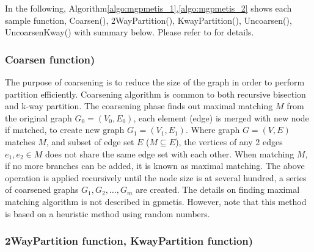 In the following,  Algorithm\ref{algo:mgpmetis_1},\ref{algo:mgpmetis_2} shows each sample function, 
Coarsen(), 2WayPartition(), KwayPartition(), Uncoarsen(), UncoarsenKway() with summary below. 
Please refer to \cite{Karypis1999} for details. 

\subsubsection{Coarsen function)}
The purpose of coarsening is to reduce the size of the graph in order to perform partition efficiently. 
Coarsening algorithm is common to both recursive bisection and k-way partition. 
The coarsening phase finds out maximal matching $M$ from the original graph $G_0=(V_0,E_0)$, 
each element (edge) is merged with new node if matched, to create new graph $G_1=(V_1,E_1)$. 
Where graph $G=(V,E)$ matches $M$, and subset of edge set $E$ ($M \subseteq E$), the vertices of any 2 edges $e_1,e_2 \in M$ does not share the same edge set with each other. 
When matching $M$, if no more branches can be added, it is known as maximal matching. 
The above operation is applied recursively until the node size is at several hundred, a series of coarsened graphs $G_1,G_2,\dots,G_m$ are created. The details on finding maximal matching algorithm is not described in gpmetis. However, note that this method is based on a heuristic method using random numbers. 
 
\subsubsection{2WayPartition function, KwayPartition function)}



